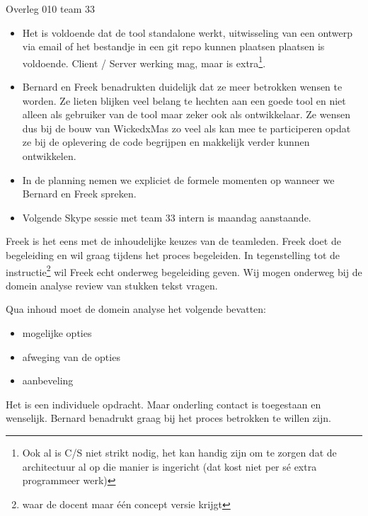 \documentclass{article}
\begin{document}
\begin{Minutes}{Overleg 010 team 33}
\begin{itemize}
\item Het is voldoende dat de tool standalone werkt, uitwisseling van een
ontwerp via email of het bestandje in een git repo kunnen plaatsen plaatsen is
voldoende. Client / Server werking mag, maar is extra\footnote{Ook al is C/S niet strikt
	nodig, het kan handig zijn om te zorgen dat de architectuur al op die manier is
	ingericht (dat kost niet per s\'{e} extra programmeer werk)}.
\end{itemize}


\begin{itemize}
\item Bernard en Freek benadrukten duidelijk dat ze meer betrokken wensen te worden.
Ze lieten blijken veel belang te hechten aan een goede tool en niet alleen
als gebruiker van de tool maar zeker ook als ontwikkelaar. Ze wensen dus bij de
bouw van WickedxMas zo veel als kan mee te participeren opdat ze bij de
oplevering de code begrijpen en makkelijk verder kunnen ontwikkelen.
\item In de planning nemen we expliciet de formele momenten op wanneer we 
Bernard en Freek spreken.
\item Volgende Skype sessie met team 33 intern is maandag aanstaande.
\end{itemize}

Freek is het eens met de inhoudelijke keuzes van de teamleden.
Freek doet de begeleiding en wil graag tijdens het proces begeleiden.
In tegenstelling tot de instructie\footnote{waar de docent maar \'e\'en 
concept versie krijgt} wil Freek echt onderweg begeleiding geven. Wij mogen
onderweg bij de domein analyse review van stukken tekst vragen.

Qua inhoud moet de domein analyse het volgende bevatten:

\begin{itemize}
	\item mogelijke opties
	\item afweging van de opties
	\item aanbeveling
\end{itemize}

Het is een individuele opdracht. Maar onderling contact is toegestaan en wenselijk.
Bernard benadrukt graag bij het proces betrokken te willen zijn.

\end{Minutes}
\end{document}
